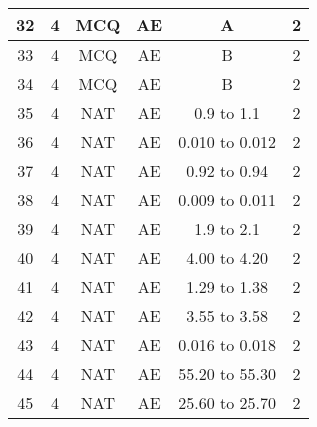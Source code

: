\begin{tabular}[12pt]{|c|c|c|c|c|c|}
\hline
32 & 4 & MCQ & AE & A & 2 \\
\hline
33 & 4 & MCQ & AE & B & 2 \\
\hline
34 & 4 & MCQ & AE & B & 2 \\
\hline
35 & 4 & NAT & AE & 0.9 to 1.1 & 2\\
    \hline
    36 & 4 & NAT & AE & 0.010 to 0.012 & 2\\
    \hline
    37 & 4 & NAT & AE & 0.92 to 0.94 & 2\\
    \hline
    38 & 4 & NAT & AE & 0.009 to 0.011 & 2\\
    \hline
    39 & 4 & NAT & AE & 1.9 to 2.1 & 2\\
    \hline
    40 & 4 & NAT & AE & 4.00 to 4.20 & 2\\
    \hline
     41 & 4 & NAT & AE & 1.29 to 1.38 & 2\\
    \hline
    42 & 4 & NAT & AE & 3.55 to 3.58 & 2\\
    \hline
    43 & 4 & NAT & AE & 0.016 to 0.018 & 2\\
    \hline
    44 & 4 & NAT & AE & 55.20 to 55.30 & 2\\
    \hline
    45 & 4 & NAT & AE & 25.60 to 25.70 & 2\\
    \hline
\end{tabular}



